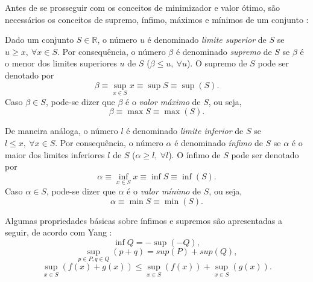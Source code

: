 Antes de se prosseguir com os conceitos de minimizador e valor \'{o}timo, s\~{a}o necess\'{a}rios os
conceitos de supremo, \'{i}nfimo, m\'{a}ximos e m\'{i}nimos de um conjunto \cite{yang}:
\begin{definition} \label{defSupInf}
Dado um conjunto $S \in \mathbb{R}$, o n\'{u}mero $u$ \'{e} denominado \textit{limite superior} de $S$ se $u \ge x, ~ \forall x \in S$. Por consequ\^{e}ncia, o n\'{u}mero $\beta$ \'{e} denominado \textit{supremo} de $S$ se $\beta$ \'{e} o menor dos limites superiores $u$ de $S$ ($\beta \le u ,~\forall u$). O supremo de $S$ pode ser denotado por
\begin{equation}
\beta \equiv \sup_{x \in S} x \equiv \sup S \equiv \sup(S).
\end{equation}
Caso $\beta \in S$, pode-se dizer que $\beta$ \'{e} o \textit{valor m\'{a}ximo} de $S$, ou seja,
\begin{equation}
\beta \equiv \max S \equiv \max(S).
\end{equation}

De maneira an\'{a}loga, o n\'{u}mero $l$ \'{e} denominado \textit{limite inferior} de $S$ se $l \le x, ~ \forall x \in S$. Por consequ\^{e}ncia, o n\'{u}mero $\alpha$ \'{e} denominado \textit{\'{i}nfimo} de $S$ se $\alpha$ \'{e} o maior dos limites inferiores $l$ de $S$ ($\alpha \ge l ,~\forall l$). O \'{i}nfimo de $S$ pode ser denotado por
\begin{equation}
\alpha \equiv \inf_{x \in S} x \equiv \inf S \equiv \inf(S).
\end{equation}
Caso $\alpha \in S$, pode-se dizer que $\alpha$ \'{e} o \textit{valor m\'{i}nimo} de $S$, ou seja,
\begin{equation}
\alpha \equiv \min S \equiv \min(S).
\end{equation}
\end{definition} 

Algumas propriedades b\'{a}sicas sobre \'{i}nfimos e supremos s\~{a}o apresentadas a seguir, de acordo com Yang \cite{yang}:
\begin{equation}
\inf Q = -\sup(-Q),
\end{equation}
\begin{equation}
\sup_{p \in P, q \in Q} (p+q) = sup(P) + sup(Q),
\end{equation}
\begin{equation}
\sup_{x \in S}\left(f(x)+g(x)\right) \le \sup_{x \in S}\left(f(x)\right) + \sup_{x \in S}\left(g(x)\right).
\end{equation}

